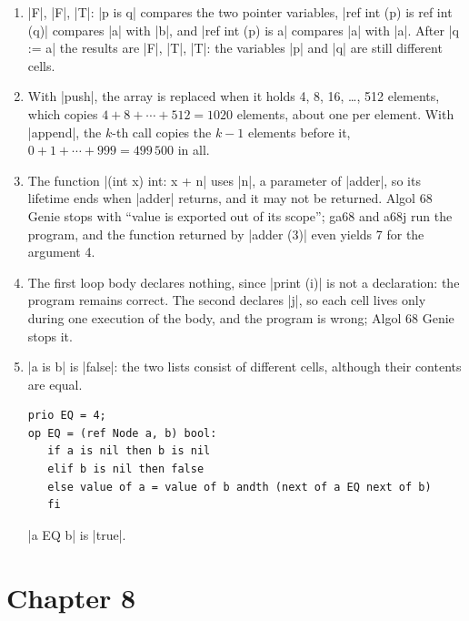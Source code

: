 \begin{enumerate}
  rejected: \code|2| is an \code|int|, and uniting cannot follow widening.
  (d) is accepted.
\item \code|F|, \code|F|, \code|T|: \code|p is q| compares the two
  pointer variables, \code|ref int (p) is ref int (q)| compares \code|a|
  with \code|b|, and \code|ref int (p) is a| compares \code|a| with
  \code|a|. After \code|q := a| the results are \code|F|, \code|T|,
  \code|T|: the variables \code|p| and \code|q| are still different
  cells.
\item With \code|push|, the array is replaced when it holds 4, 8, 16,
  \ldots, 512 elements, which copies $4 + 8 + \cdots + 512 = 1020$
  elements, about one per element. With \code|append|, the $k$-th call
  copies the $k - 1$ elements before it, $0 + 1 + \cdots + 999 = 499\,500$
  in all.
\item The function \code|(int x) int: x + n| uses \code|n|, a parameter
  of \code|adder|, so its lifetime ends when \code|adder| returns, and it
  may not be returned. Algol 68 Genie stops with ``value is exported out
  of its scope''; ga68 and a68j run the program, and the
  function returned by \code|adder (3)| even yields 7 for the argument 4.
\item The first loop body declares nothing, since \code|print (i)| is not
  a declaration: the program remains correct. The second declares
  \code|j|, so each cell lives only during one execution of the body, and
  the program is wrong; Algol 68 Genie stops it.
\item \code|a is b| is \code|false|: the two lists consist of different
  cells, although their contents are equal.
\begin{lstlisting}
prio EQ = 4;
op EQ = (ref Node a, b) bool:
   if a is nil then b is nil
   elif b is nil then false
   else value of a = value of b andth (next of a EQ next of b)
   fi
\end{lstlisting}
  \code|a EQ b| is \code|true|.
\end{enumerate}

\section*{Chapter 8}\label{ans-ch8}

